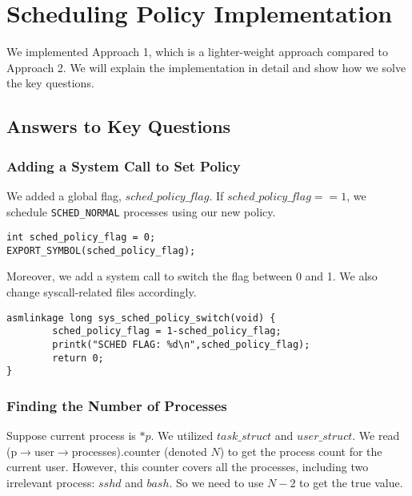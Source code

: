 \documentclass[11pt]{article}
\begin{document}
\section{Scheduling Policy Implementation}
We implemented Approach 1, which is a lighter-weight approach compared to Approach 2. We will explain the implementation in detail and show how we solve the key questions.
\subsection{Answers to Key Questions}
\subsubsection{Adding a System Call to Set Policy}
We added a global flag, $sched\_policy\_flag$. If $sched\_policy\_flag == 1$, we schedule \texttt{SCHED\_NORMAL} processes using our new policy.
\begin{lstlisting}[style=CStyle]
int sched_policy_flag = 0;
EXPORT_SYMBOL(sched_policy_flag);
\end{lstlisting}

Moreover, we add a system call to switch the flag between 0 and 1. We also change syscall-related files accordingly. 

\begin{lstlisting}[style=CStyle]
asmlinkage long sys_sched_policy_switch(void) {
        sched_policy_flag = 1-sched_policy_flag;
        printk("SCHED FLAG: %d\n",sched_policy_flag);
        return 0;
}
\end{lstlisting}

\subsubsection{Finding the Number of Processes}
Suppose current process is $*p$. We utilized $task\_struct$ and $user\_struct$. We read (p$\rightarrow$user$\rightarrow$processes).counter (denoted $N$) to get the process count for the current user. However, this counter covers all the processes, including two irrelevant process: $sshd$ and $bash$. So we need to use $N-2$ to get the true value.
\end{document}
